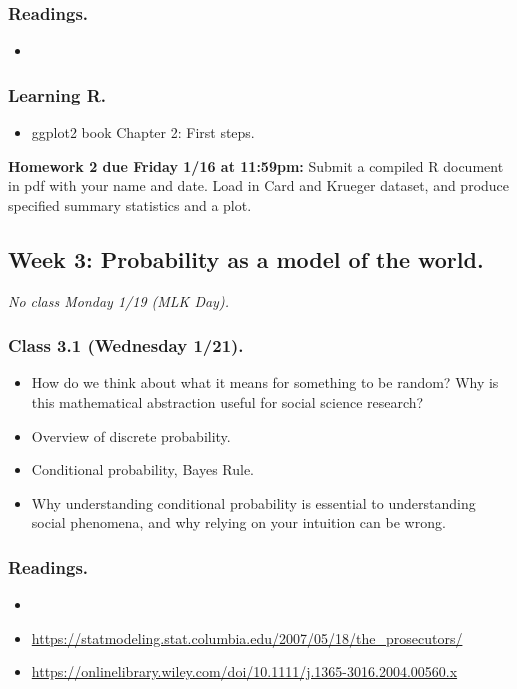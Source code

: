 \documentclass[letterpaper, 12pt, parskip=full,DIV=10]{scrartcl}
\begin{document}
\subsubsection*{Readings.}
\begin{itemize}
\item {}
\end{itemize}

\subsubsection*{Learning R.}
\begin{itemize}
\item ggplot2 book Chapter 2: First steps.
\end{itemize}

\textbf{Homework 2 due Friday 1/16 at 11:59pm:}
Submit a compiled R document in pdf with your name and date.
Load in Card and Krueger dataset, and produce specified summary statistics and a plot.

\subsection*{Week 3: Probability as a model of the world.}
\textit{No class Monday 1/19 (MLK Day).}
\subsubsection*{Class 3.1 (Wednesday 1/21).}
\begin{itemize}
\item How do we think about what it means for something to be random? Why is this mathematical abstraction useful for social science research?
\item Overview of discrete probability.
\item Conditional probability, Bayes Rule.
\item Why understanding conditional probability is essential to understanding social phenomena, and why relying on your intuition can be wrong.
\end{itemize}

\subsubsection*{Readings.}
\begin{itemize}
\item {}
\item {} \url{https://statmodeling.stat.columbia.edu/2007/05/18/the_prosecutors/}
\item {} \url{https://onlinelibrary.wiley.com/doi/10.1111/j.1365-3016.2004.00560.x}
\end{itemize}
\end{document}

